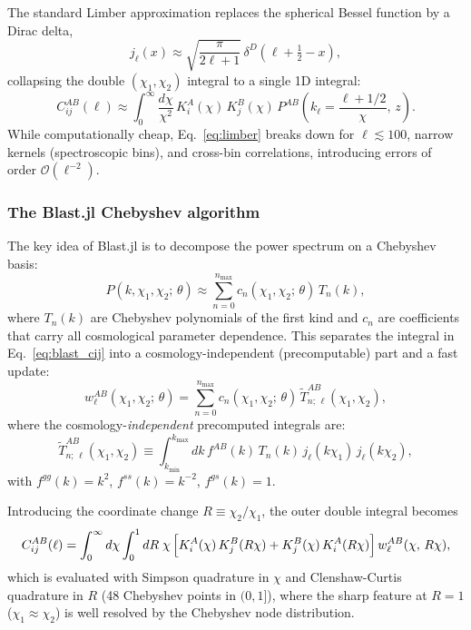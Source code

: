 The standard Limber approximation replaces the spherical Bessel
function by a Dirac delta,
\begin{equation}
    j_\ell(x) \approx \sqrt{\frac{\pi}{2\ell+1}}\,
    \delta^D\!\left(\ell+\tfrac{1}{2} - x\right),
\end{equation}
collapsing the double $(\chi_1,\chi_2)$ integral to a single 1D
integral:
\begin{equation}
    C_{ij}^{AB}(\ell) \approx
    \int_0^\infty \frac{d\chi}{\chi^2}\,
    K_i^A(\chi)\,K_j^B(\chi)\,
    P^{AB}\!\left(k_\ell = \frac{\ell+1/2}{\chi},\,z\right).
    \label{eq:limber}
\end{equation}
While computationally cheap, Eq.~\eqref{eq:limber} breaks down for
$\ell \lesssim 100$, narrow kernels (spectroscopic bins), and
cross-bin correlations, introducing errors of order $\mathcal{O}(\ell^{-2})$.

\subsubsection{The Blast.jl Chebyshev algorithm}

The key idea of Blast.jl is to decompose the power spectrum on a
Chebyshev basis:
\begin{equation}
    P(k,\chi_1,\chi_2;\,\theta) \approx
    \sum_{n=0}^{n_{\max}} c_n(\chi_1,\chi_2;\,\theta)\,T_n(k),
    \label{eq:cheb_pk}
\end{equation}
where $T_n(k)$ are Chebyshev polynomials of the first kind and $c_n$
are coefficients that carry all cosmological parameter dependence.
This separates the integral in Eq.~\eqref{eq:blast_cij} into a
cosmology-independent (precomputable) part and a fast update:
\begin{equation}
    w_\ell^{AB}(\chi_1,\chi_2;\,\theta) =
    \sum_{n=0}^{n_{\max}} c_n(\chi_1,\chi_2;\,\theta)\,
    \tilde{T}_{n;\,\ell}^{AB}(\chi_1,\chi_2),
    \label{eq:w_decomp}
\end{equation}
where the cosmology-\emph{independent} precomputed integrals are:
\begin{equation}
    \tilde{T}_{n;\,\ell}^{AB}(\chi_1,\chi_2) \equiv
    \int_{k_{\min}}^{k_{\max}} dk\,f^{AB}(k)\,T_n(k)\,
    j_\ell(k\chi_1)\,j_\ell(k\chi_2),
\end{equation}
with $f^{gg}(k)=k^2$, $f^{ss}(k)=k^{-2}$, $f^{gs}(k)=1$.

Introducing the coordinate change $R \equiv \chi_2/\chi_1$, the
outer double integral becomes
\begin{equation}
    C_{ij}^{AB}(\ell) =
    \int_0^\infty d\chi
    \int_0^1 dR\;\chi\,
    \Bigl[K_i^A(\chi)\,K_j^B(R\chi)
         + K_j^B(\chi)\,K_i^A(R\chi)\Bigr]\,
    w_\ell^{AB}(\chi,\,R\chi),
\end{equation}
which is evaluated with Simpson quadrature in $\chi$ and
Clenshaw-Curtis quadrature in $R$ (48 Chebyshev points in $(0,1]$),
where the sharp feature at $R=1$ ($\chi_1 \approx \chi_2$) is well
resolved by the Chebyshev node distribution.

